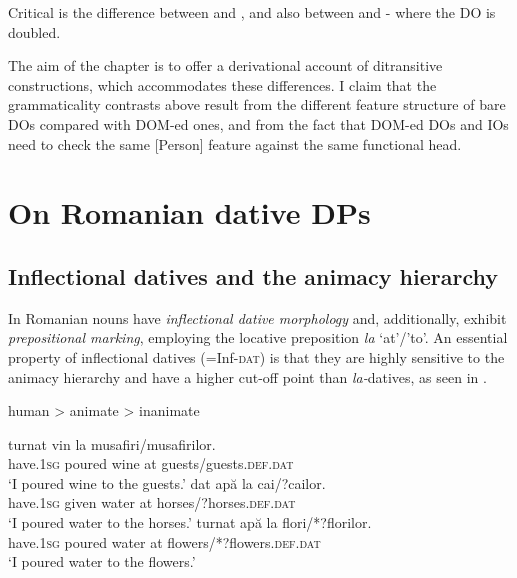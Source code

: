 \documentclass[output=paper,colorlinks,citecolor=brown,nonflat]{langsci/langscibook}
\begin{document}
Critical is the difference between  and , and also between  and - where the DO is doubled.

The aim of the chapter is to offer a derivational account of ditransitive constructions, which accommodates these differences. I claim that the grammaticality contrasts above result from the different feature structure of bare DOs compared with DOM-ed ones, and from the fact that DOM-ed DOs and IOs need to check the same [Person] feature against the same functional head.

\section{On Romanian dative DPs} %

\subsection{Inflectional datives and the animacy hierarchy} %

In Romanian nouns have \textit{inflectional dative morphology} and, additionally, exhibit \textit{prepositional marking}, employing the locative preposition \textit{la} ‘at’/’to’. An essential property of inflectional datives (=Inf-\textsc{dat}) is that they are highly sensitive to the animacy hierarchy and have a higher cut-off point than \textit{la}\textit{{}-}datives, as seen in .

\ea%
    \label{ex:cornilescu:7}
    human > animate > inanimate
    \z



\ea%
    \label{ex:cornilescu:8}
    \ea \label{ex:cornilescu:8a}
       {turnat}  {vin}   {la} musafiri/musafirilor.	\\
       	 have.\textsc{1sg}  poured   wine   at guests/guests.\textsc{def}.\textsc{dat}	 \\
    \glt ‘I poured wine to the guests.’
    \ex \label{ex:cornilescu:8b}
    	 {dat}    {apă}  {la} cai/{?}cailor. 	\\
    	have.\textsc{1sg} given   water   at horses/{?}horses.\textsc{def}.\textsc{dat} \\
    	\glt ‘I poured water to the horses.’
    \ex  \label{ex:cornilescu:8c}
     {turnat}  {apă}  {la} flori/*?florilor.	\\
     		have.\textsc{1sg} poured   water   at flowers/*?flowers.\textsc{def}.\textsc{dat} \\
    \glt	‘I poured water to the flowers.’
   	\z
    \z
\end{document}
